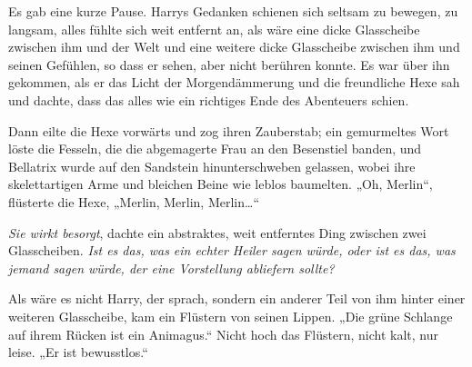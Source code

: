 Es gab eine kurze Pause. Harrys Gedanken schienen sich seltsam zu bewegen, zu langsam, alles fühlte sich weit entfernt an, als wäre eine dicke Glasscheibe zwischen ihm und der Welt und eine weitere dicke Glasscheibe zwischen ihm und seinen Gefühlen, so dass er sehen, aber nicht berühren konnte. Es war über ihn gekommen, als er das Licht der Morgendämmerung und die freundliche Hexe sah und dachte, dass das alles wie ein richtiges Ende des Abenteuers schien.

Dann eilte die Hexe vorwärts und zog ihren Zauberstab; ein gemurmeltes Wort löste die Fesseln, die die abgemagerte Frau an den Besenstiel banden, und Bellatrix wurde auf den Sandstein hinunterschweben gelassen, wobei ihre skelettartigen Arme und bleichen Beine wie leblos baumelten. „Oh, Merlin“, flüsterte die Hexe, „Merlin, Merlin, Merlin…“

\emph{Sie wirkt besorgt}, dachte ein abstraktes, weit entferntes Ding zwischen zwei Glasscheiben. \emph{Ist es das, was ein echter Heiler sagen würde, oder ist es das, was jemand sagen würde, der eine Vorstellung abliefern sollte?}

Als wäre es nicht Harry, der sprach, sondern ein anderer Teil von ihm hinter einer weiteren Glasscheibe, kam ein Flüstern von seinen Lippen. „Die grüne Schlange auf ihrem Rücken ist ein Animagus.“ Nicht hoch das Flüstern, nicht kalt, nur leise. „Er ist bewusstlos.“

